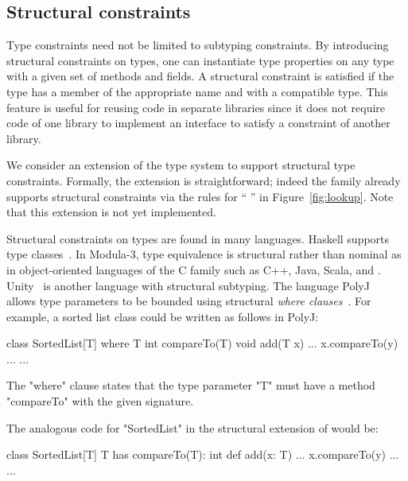 \subsection{Structural constraints}
\label{sec:structural}
\label{sec:structural-typing}

Type constraints need not be limited to subtyping constraints.
By introducing structural constraints on types, one can
instantiate
type properties on any type with a given set
of methods and fields.
A structural constraint is satisfied if the type has a member of
the appropriate name and with a compatible type.
This feature is useful for reusing code
in separate libraries since it does not require
code of one library to implement an interface to satisfy a
constraint of another library.

We consider an extension of the \Xten{} type system
to support structural type constraints.
Formally, the extension
is straightforward; indeed the \FX{} family already supports structural
constraints
via the rules for ``  '' in
Figure~\ref{fig:lookup}.
Note that this extension is not yet implemented.

Structural constraints on types are found in many languages.
Haskell supports type
classes~\cite{haskell,haskell-type-classes}.
%
In Modula-3, type equivalence is structural
rather than nominal as in object-oriented languages of the C
family such as C++, Java, Scala, and \Xten{}.
Unity~\cite{malayeriIntegrating08}
is another language with structural subtyping.
%
The language PolyJ~\cite{java-popl97} allows type parameters to be
bounded using
structural \emph{where clauses}~\cite{where-clauses}.
For example, a sorted list class %
could
be written as follows in PolyJ:
{
\begin{xten}
class SortedList[T]
  where T {int compareTo(T)} {
    void add(T x) {... x.compareTo(y) ...}
    ...
}
\end{xten}}
The \xcd"where" clause states that the type parameter \xcd"T" must have a
method \xcd"compareTo" with the given signature.

The analogous code for \xcd"SortedList" in the structural
extension of \Xten{} would be:
{
\begin{xten}
class SortedList[T]
  {T has compareTo(T): int} {
    def add(x: T) {... x.compareTo(y) ...}
    ...
}
\end{xten}}

